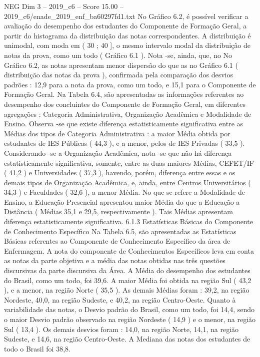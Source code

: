 \begin{textsample}{NEG Dim 3 – 2019\_c6 – Score 15.00 – 2019\_c6/enade\_2019\_enf\_ba60297fd1.txt}
No Gráfico 6.2, é possível verificar a avaliação do desempenho dos estudantes do Componente de Formação Geral, a partir do histograma da distribuição das notas correspondentes.
A distribuição é unimodal, com moda em ( 30 ; 40 ], o mesmo intervalo modal da distribuição de notas da prova, como um todo ( Gráfico 6.1 ).
Nota -se, ainda, que, no No Gráfico 6.2, as notas apresentam menor dispersão do que as no Gráfico 6.1 ( distribuição das notas da prova ), confirmada pela comparação dos desvios padrões : 12,9 para a nota da prova, como um todo, e 15,1 para o Componente de Formação Geral.
Na Tabela 6.4, são apresentadas as informações referentes ao desempenho dos concluintes do Componente de Formação Geral, em diferentes agregações : Categoria Administrativa, Organização Acadêmica e Modalidade de Ensino.
Observa -se que existe diferença estatisticamente significativa entre as Médias dos tipos de Categoria Administrativa : a maior Média obtida por estudantes de IES Públicas ( 44,3 ), e a menor, pelos de IES Privadas ( 33,5 ).
Considerando -se a Organização Acadêmica, nota -se que não há diferença estatisticamente significativa, somente, entre as duas maiores Médias, CEFET/IF ( 41,2 ) e Universidades ( 37,3 ), havendo, porém, diferença entre essas e os demais tipos de Organização Acadêmica, e, ainda, entre Centros Universitários ( 34,3 ) e Faculdades ( 32,6 ), a menor Média.
No que se refere a Modalidade de Ensino, a Educação Presencial apresentou maior Média do que a Educação a Distância ( Médias 35,1 e 29,5, respectivamente ).
Tais Médias apresentam diferença estatisticamente significativa. 6.1.3 Estatísticas Básicas do Componente de Conhecimento Específico Na Tabela 6.5, são apresentadas as Estatísticas Básicas referentes ao Componente de Conhecimento Específico da área de Enfermagem.
A nota do componente de Conhecimentos Específicos leva em conta as notas da parte objetiva e a média das notas obtidas nas três questões discursivas da parte discursiva da Área.
A Média do desempenho dos estudantes do Brasil, como um todo, foi 39,6.
A maior Média foi obtida na região Sul ( 43,2 ), e a menor, na região Norte ( 35,5 ).
As demais Médias foram : 39,2, na região Nordeste, 40,0, na região Sudeste, e 40,2, na região Centro-Oeste.
Quanto à variabilidade das notas, o Desvio padrão do Brasil, como um todo, foi 14,4, sendo o maior Desvio padrão observado na região Nordeste ( 14,9 ) e o menor, na região Sul ( 13,4 ).
Os demais desvios foram : 14,0, na região Norte, 14,1, na região Sudeste, e 14,6, na região Centro-Oeste.
A Mediana das notas dos estudantes de todo o Brasil foi 38,8.

\end{textsample}
